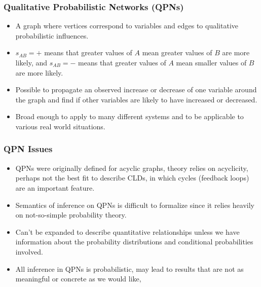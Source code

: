 \documentclass{beamer}
\begin{document}
\begin{frame}
\frametitle{Qualitative Probabilistic Networks (QPNs)}
\begin{itemize}

\item A graph where vertices correspond to variables and edges to qualitative probabilistic influences.

\item $s_{AB} = +$ means that greater values of $A$ mean
greater values of $B$ are more likely, and $s_{AB}=-$ means that
greater values of $A$ mean smaller values of $B$ are more likely.

\item Possible to propagate an observed increase
or decrease of one variable around the graph and find if other
variables are likely to have increased or decreased.

\item Broad enough to apply to many different systems and
to be applicable to various real world situations.
\end{itemize}
\end{frame}

\begin{frame}
\frametitle{QPN Issues}
\begin{itemize}
\item QPNs were originally defined for acyclic graphs, theory relies on
  acyclicity, perhaps not the best
fit to describe CLDs, in which cycles (feedback loops) are an important feature.

\item Semantics of inference on QPNs is difficult to
formalize since it relies heavily on not-so-simple probability theory.

\item Can't be expanded to describe quantitative relationships unless we have information about
the probability distributions and conditional probabilities involved.

\item All inference in QPNs is probabilistic, may lead to
results that are not as meaningful or concrete as we would like,
\end{itemize}
\end{frame}
\end{document}
